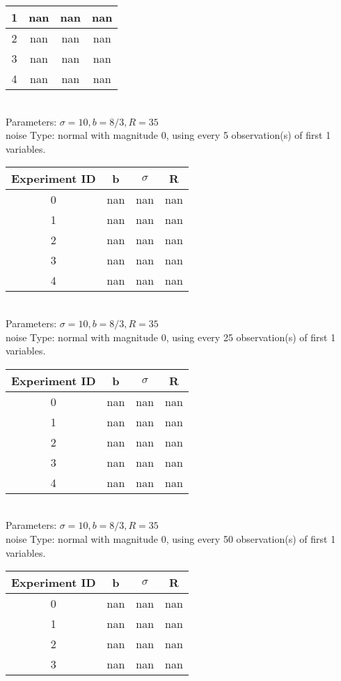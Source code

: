 \begin{multicols}{3}
\begin{tabular}{cccc}
 1 & nan & nan & nan\\ \hline 
 2 & nan & nan & nan\\ \hline 
 3 & nan & nan & nan\\ \hline 
 4 & nan & nan & nan\\ \hline 
 \end{tabular}\\
Parameters: $\sigma=10, b=8/3, R=35$\\
noise Type: normal with magnitude 0, using every 5 observation(s) of first 1 variables.\\
\begin{tabular}{cccc}
\hline Experiment ID & b & $\sigma$ & R \\ \hline 
0 & nan & nan & nan\\ \hline 
 1 & nan & nan & nan\\ \hline 
 2 & nan & nan & nan\\ \hline 
 3 & nan & nan & nan\\ \hline 
 4 & nan & nan & nan\\ \hline 
 \end{tabular}\\
Parameters: $\sigma=10, b=8/3, R=35$\\
noise Type: normal with magnitude 0, using every 25 observation(s) of first 1 variables.\\
\begin{tabular}{cccc}
\hline Experiment ID & b & $\sigma$ & R \\ \hline 
0 & nan & nan & nan\\ \hline 
 1 & nan & nan & nan\\ \hline 
 2 & nan & nan & nan\\ \hline 
 3 & nan & nan & nan\\ \hline 
 4 & nan & nan & nan\\ \hline 
 \end{tabular}\\
Parameters: $\sigma=10, b=8/3, R=35$\\
noise Type: normal with magnitude 0, using every 50 observation(s) of first 1 variables.\\
\begin{tabular}{cccc}
\hline Experiment ID & b & $\sigma$ & R \\ \hline 
0 & nan & nan & nan\\ \hline 
 1 & nan & nan & nan\\ \hline 
 2 & nan & nan & nan\\ \hline 
 3 & nan & nan & nan\\ \hline 

\end{tabular}
\end{multicols}
